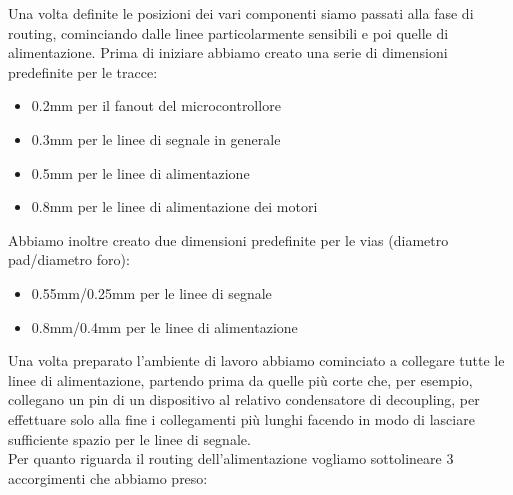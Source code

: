 \noindent Una volta definite le posizioni dei vari componenti siamo passati alla
fase di routing, cominciando dalle linee particolarmente sensibili e poi
quelle di alimentazione. Prima di iniziare abbiamo creato una serie di
dimensioni predefinite per le tracce:

\begin{itemize}
\item
  
  0.2mm per il fanout del microcontrollore
  
\item
  
  0.3mm per le linee di segnale in generale
  
\item
  
  0.5mm per le linee di alimentazione
  
\item
  
  0.8mm per le linee di alimentazione dei motori
  
\end{itemize}

\noindent Abbiamo inoltre creato due dimensioni predefinite per le vias (diametro
pad/diametro foro):

\begin{itemize}
\item
  
  0.55mm/0.25mm per le linee di segnale
  
\item
  
  0.8mm/0.4mm per le linee di alimentazione
  
\end{itemize}

\noindent Una volta preparato l'ambiente di lavoro abbiamo cominciato a collegare
tutte le linee di alimentazione, partendo prima da quelle più corte che,
per esempio, collegano un pin di un dispositivo al relativo condensatore
di decoupling, per effettuare solo alla fine i collegamenti più lunghi
facendo in modo di lasciare sufficiente spazio per le linee di segnale.\\
Per quanto riguarda il routing dell'alimentazione vogliamo sottolineare
3 accorgimenti che abbiamo preso:


